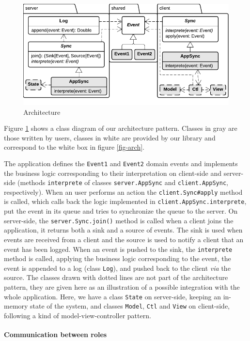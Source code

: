 \documentclass{llncs}
\begin{document}
\begin{figure}
\centering
\includegraphics[width=12cm]{classes2.pdf}
\caption{Architecture}
\label{fig-classes-2}
\end{figure}

Figure \ref{fig-classes-2} shows a class diagram of our architecture pattern. Classes in gray are those written by users, classes in white are provided by our library and correspond to the white box in figure \ref{fig-arch}.

The application defines the {\tt Event1} and {\tt Event2} domain events and implements the business logic corresponding to their interpretation on client-side and server-side (methods {\tt interprete} of classes {\tt server.AppSync} and {\tt client.AppSync}, respectively). When an user performs an action the {\tt client.Sync\#apply} method is called, which calls back the logic implemented in {\tt client.AppSync.interprete}, put the event in its queue and tries to synchronize the queue to the server. On server-side, the {\tt server.Sync.join()} method is called when a client joins the application, it returns both a sink and a source of events. The sink is used when events are received from a client and the source is used to notify a client that an event has been logged. When an event is pushed to the sink, the {\tt interprete} method is called, applying the business logic corresponding to the event, the event is appended to a log (class {\tt Log}), and pushed back to the client \emph{via} the source. The classes drawn with dotted lines are not part of the architecture pattern, they are given here as an illustration of a possible integration with the whole application. Here, we have a class {\tt State} on server-side, keeping an in-memory state of the system, and classes {\tt Model}, {\tt Ctl} and {\tt View} on client-side, following a kind of model-view-controller pattern.

\paragraph{Communication between roles}
\end{document}
